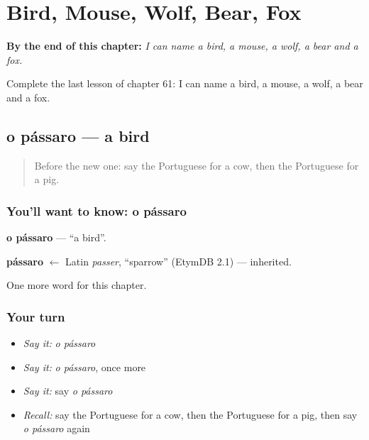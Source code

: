 
\chapter{Bird, Mouse, Wolf, Bear, Fox}
\label{ch:pt-bird-mouse-wolf-bear-fox}

\begin{chapteropening}
\textbf{By the end of this chapter:} \emph{I can name a bird, a mouse, a wolf, a bear and a fox.}

Complete the last lesson of chapter 61: I can name a bird, a mouse, a wolf, a bear and a fox.
\end{chapteropening}

\section[o pássaro]{o pássaro — a bird}

\label{lesson:PT-C61-passaro}



\begin{quote}
Before the new one: say the Portuguese for a cow, then the Portuguese for a pig.
\end{quote}

\subsection*{You'll want to know: o pássaro}
\textbf{o pássaro} — \textquotedblleft{}a bird\textquotedblright{}.

\begin{cousinweb}
\textbf{pássaro} $\leftarrow$ Latin \emph{passer}, \textquotedblleft{}sparrow\textquotedblright{} (EtymDB 2.1) — inherited.
\end{cousinweb}

\begin{grammarlens}[title={What you've built}]
One more word for this chapter.
\end{grammarlens}

\subsection*{Your turn}
\begin{itemize}
\raggedright
  \item \emph{Say it:} \emph{o pássaro}
  \item \emph{Say it:} \emph{o pássaro}, once more
  \item \emph{Say it:} say \emph{o pássaro}
  \item \emph{Recall:} say the Portuguese for a cow, then the Portuguese for a pig, then say \emph{o pássaro} again
\end{itemize}

